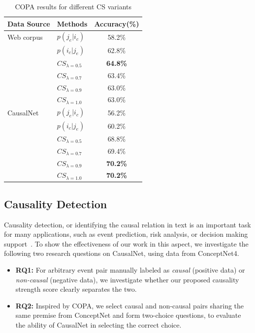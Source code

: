 \documentclass[letterpaper]{article}
\begin{document}
\begin{table}[th]
\small
\centering
\caption{COPA results for different CS variants}
\label{tab:varcs}
\begin{tabular}{llc}
\hline
Data Source & Methods & Accuracy(\%) \\
\hline
Web corpus & $p(j_e | i_c)$ & 58.2\%\\
 & $p(i_c | j_e)$ & 62.8\% \\
 & $CS_{\lambda=0.5}$ & {\bf 64.8\%} \\
 & $CS_{\lambda=0.7}$ & 63.4\% \\
 & $CS_{\lambda=0.9}$ & 63.0\% \\
 & $CS_{\lambda=1.0}$ & 63.0\% \\
 \hline
CausalNet & $p(j_e | i_c)$ & 56.2\% \\
 & $p(i_c | j_e)$ & 60.2\% \\
 & $CS_{\lambda=0.5}$ & 68.8\% \\
 & $CS_{\lambda=0.7}$ & 69.4\% \\
 & $CS_{\lambda=0.9}$ & {\bf 70.2\%} \\
 & $CS_{\lambda=1.0} $ & {\bf 70.2\%} \\
\hline
\end{tabular}
\end{table}

\subsection{Causality Detection}

Causality detection, or identifying the causal relation in text is
an important task for many applications, such as event prediction,
risk analysis, or decision making support~\cite{mirza2014extracting}.
To show the effectiveness of our work in this aspect,
we investigate the following two research questions on
CausalNet, using data from ConceptNet4.
\begin{itemize}
\item {\bf RQ1:}
For arbitrary event pair manually labeled as \emph{causal} (positive data)
or \emph{non-causal} (negative data), we investigate whether our
proposed causality strength score clearly separates the two.
\item {\bf RQ2:} Inspired by COPA, we select causal and non-causal pairs
sharing the same premise from ConceptNet and form two-choice
questions, to evaluate the ability of CausalNet in selecting the
correct choice.
\end{itemize}
\end{document}
